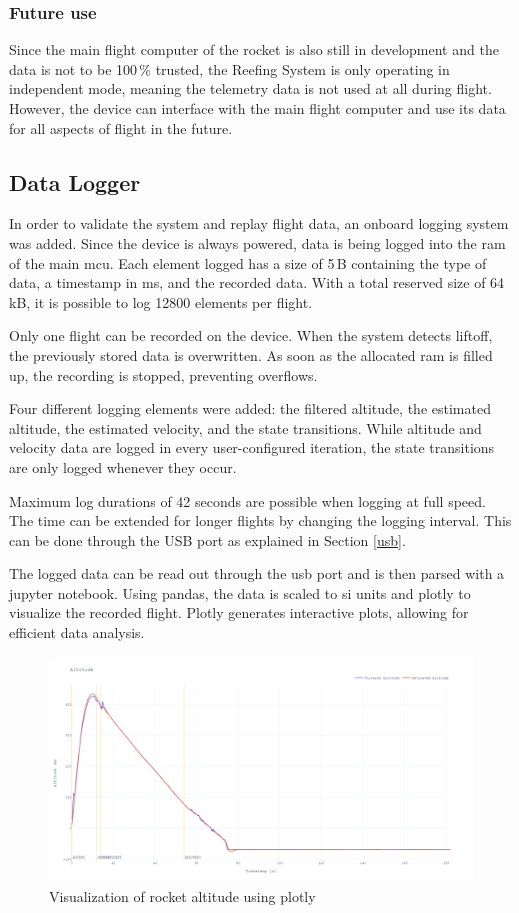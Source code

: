 \subsubsection{Future use}
Since the main flight computer of the rocket is also still in development and the data is not to be 100\,\% trusted, the Reefing System is only operating in independent mode, meaning the telemetry data is not used at all during flight. However, the device can interface with the main flight computer and use its data for all aspects of flight in the future. 

\subsection{Data Logger}
In order to validate the system and replay flight data, an onboard logging system was added. Since the device is always powered, data is being logged into the \acrshort{ram} of the main \acrshort{mcu}. Each element logged has a size of 5\,B containing the type of data, a timestamp in ms, and the recorded data. With a total reserved size of 64\,kB, it is possible to log 12800 elements per flight.

Only one flight can be recorded on the device. When the system detects liftoff, the previously stored data is overwritten. As soon as the allocated \acrshort{ram} is filled up, the recording is stopped, preventing overflows.  

Four different logging elements were added: the filtered altitude, the estimated altitude, the estimated velocity, and the state transitions. While altitude and velocity data are logged in every user-configured iteration, the state transitions are only logged whenever they occur. 

Maximum log durations of 42 seconds are possible when logging at full speed. The time can be extended for longer flights by changing the logging interval. This can be done through the USB port as explained in Section \ref{usb}.

The logged data can be read out through the \acrshort{usb} port and is then parsed with a jupyter notebook. Using pandas, the data is scaled to \acrshort{si} units and plotly to visualize the recorded flight. Plotly generates interactive plots, allowing for efficient data analysis.

\begin{figure}[h!]
	\includegraphics[width=\textwidth]{images/plotly}
	\caption{Visualization of rocket altitude using plotly}
	\label{fig:plotly}
\end{figure}

